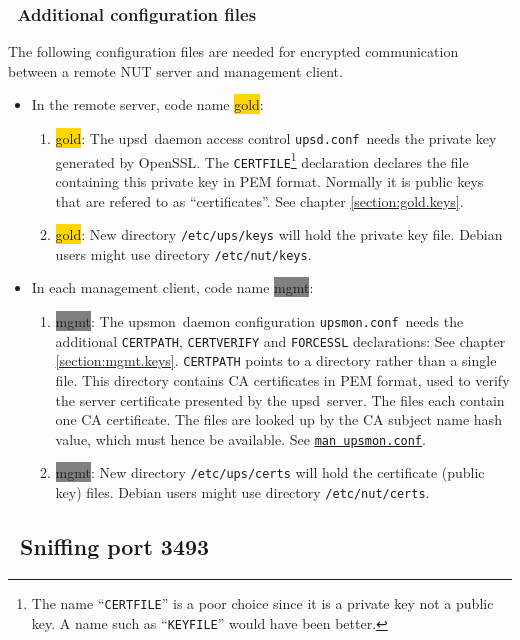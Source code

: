 \documentclass[12pt]{article}
\newlength{\headersep}\setlength{\headersep}{3mm}
\newcommand{\Hsep}{\hspace{\headersep}}
\newcommand{\newcolumn}{\vfill\eject}
\newcommand{\upsd}{\mbox{\textcolor{UPSDCOLOUR}{upsd}}}
\newcommand{\upsmon}{\mbox{\textcolor{MONCOLOUR}{upsmon}}}
\newcommand{\gold}[1][gold]{\colorbox{GOLD}{#1}}
\newcommand{\mgmt}[1][mgmt]{\colorbox{GRAY}{#1}}
\newcommand{\upsdconf}{\textcolor{UPSDCOLOUR}{\texttt{upsd.conf}}}
\newcommand{\upsmonconf}{\textcolor{MONCOLOUR}{\texttt{upsmon.conf}}}
\newcommand{\NUTman}[1]{\href{http://networkupstools.org/docs/man/#1.html}{\texttt{man #1}}}
\newcommand{\ol}{\begin{enumerate}%
   \setlength{\itemsep}{0em}}
\newcommand{\eol}{\end{enumerate}}
\newcommand{\ul}{\begin{itemize}%
   \setlength{\itemsep}{0em}}
\newcommand{\eul}{\end{itemize}}
\newcommand{\li}{\item}                 %
\begin{document}
\subsubsection{\Hsep\ Additional configuration files}\label{section:addfiles}

The following configuration files are needed for encrypted
communication between a remote NUT server and management client.

\ul

\li In the remote server, code name \gold:

\ol

\li \gold: The \upsd\ daemon access control \upsdconf\ needs the private key
generated by OpenSSL.  The \texttt{CERTFILE}\footnote{The name
  ``\texttt{CERTFILE}'' is a poor choice since it is a private key not a
  public key.  A name such as ``\texttt{KEYFILE}'' would have been better.}
declaration declares the file containing this private key in PEM format.
Normally it is public keys that are refered to as ``certificates''.  See
chapter \ref{section:gold.keys}.

\li \gold: New directory \texttt{/etc/ups/keys} will hold the private key file. 
Debian users might use directory \texttt{/etc/nut/keys}.

\eol

\li In each management client, code name \mgmt:

\ol

\li \mgmt: The \upsmon\ daemon configuration \upsmonconf\ needs the additional
\texttt{CERTPATH}, \texttt{CERTVERIFY} and \texttt{FORCESSL} declarations: See
chapter \ref{section:mgmt.keys}.  \texttt{CERTPATH} points to a directory
rather than a single file.  This directory contains CA certificates in PEM
format, used to verify the server certificate presented by the
\upsd\ server. The files each contain one CA certificate. The files are looked
up by the CA subject name hash value, which must hence be available.  See
\NUTman{upsmon.conf}.

\li \mgmt: New directory \texttt{/etc/ups/certs} will hold the certificate
(public key) files.  Debian users might use directory \texttt{/etc/nut/certs}.

\eol

\eul

\subsection{\Hsep\ Sniffing port 3493}\label{section:SSL.sniff}
\end{document}
